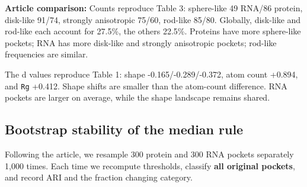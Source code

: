 \documentclass[
  10pt,
]{article}
\begin{document}
\textbf{Article comparison:} Counts reproduce Table 3: sphere-like 49
RNA/86 protein, disk-like 91/74, strongly anisotropic 75/60, rod-like
85/80. Globally, disk-like and rod-like each account for 27.5\%, the
others 22.5\%. Proteins have more sphere-like pockets; RNA has more
disk-like and strongly anisotropic pockets; rod-like frequencies are
similar.

The d values reproduce Table 1: shape -0.165/-0.289/-0.372, atom count
+0.894, and \texttt{Rg} +0.412. Shape shifts are smaller than the
atom-count difference. RNA pockets are larger on average, while the
shape landscape remains shared.

\subsection{Bootstrap stability of the median
rule}\label{bootstrap-stability-of-the-median-rule}

Following the article, we resample 300 protein and 300 RNA pockets
separately 1,000 times. Each time we recompute thresholds, classify
\textbf{all original pockets}, and record ARI and the fraction changing
category.
\end{document}
